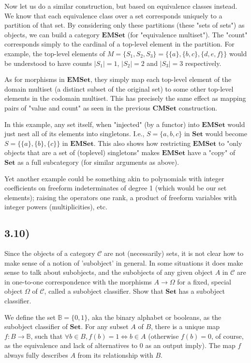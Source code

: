 Now let us do a similar construction, but based on equivalence classes instead. We know that each equivalence class over a set corresponds uniquely to a partition of that set. By considering only these partitions (these "sets of sets") as objects, we can build a category $\mathbf{EMSet}$ (for "equivalence multiset"). The "count" corresponds simply to the cardinal of a top-level element in the partition. For example, the top-level elements of $M = \{ S_1, S_2, S_3 \}= \{ \{a\}, \{b, c\}, \{d, e, f\} \}$ would be understood to have counts $|S_1| = 1$, $|S_2| = 2$ and $|S_3| = 3$ respectively.

As for morphisms in $\mathbf{EMSet}$, they simply map each top-level element of the domain multiset (a distinct subset of the original set) to some other top-level elements in the codomain multiset. This has precisely the same effect as mapping pairs of "value and count" as seen in the previous $\mathbf{CMSet}$ construction.

In this example, any set itself, when "injected" (by a functor) into $\mathbf{EMSet}$ would just nest all of its elements into singletons. I.e., $S = \{ a, b, c \}$ in $\mathbf{Set}$ would become $S = \{ \{a\}, \{b\}, \{c\} \}$ in $\mathbf{EMSet}$. This also shows how restricting $\mathbf{EMSet}$ to "only objects that are a set of (toplevel) singletons" makes $\mathbf{EMSet}$ have a "copy" of $\mathbf{Set}$ as a full subcategory (for similar arguments as above).

Yet another example could be something akin to polynomials with integer coefficients on freeform indeterminates of degree 1 (which would be our set elements); raising the operators one rank, a product of freeform variables with integer powers (multiplicities), etc.


\subsection*{3.10)}

Since the objects of a category $\mathcal{C}$ are not (necessarily) sets, it is not clear how to make sense of a notion of 'subobject' in general. In some situations it does make sense to talk about subobjects, and the subobjects of any given object $A$ in $\mathcal{C}$ are in one-to-one correspondence with the morphisms $A \to \Omega$ for a fixed, special object $\Omega$ of $\mathcal{C}$, called a subobject classifier. Show that $\mathbf{Set}$ has a subobject classifier.

We define the set $\mathbb{B} = \{ 0, 1 \}$, aka the binary alphabet or booleans, as the subobject classifier of $\mathbf{Set}$. For any subset $A$ of $B$, there is a unique map $f: B \to \mathbb{B}$, such that $\forall b \in B, f(b) = 1 \Leftrightarrow b \in A$ (otherwise $f(b) = 0$, of course, as the equivalence and lack of alternatives to $0$ as an output imply). The map $f$ always fully describes $A$ from its relationship with $B$.




